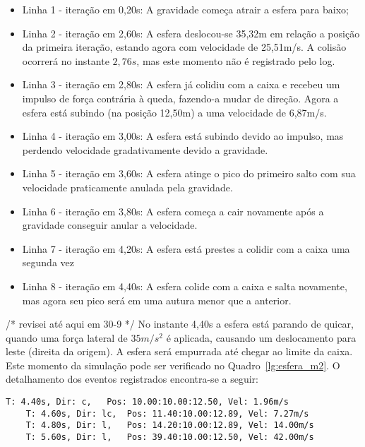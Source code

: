 \documentclass[12pt]{article}
\begin{document}
\begin{itemize}
	\item Linha 1 - iteração em 0,20s: A gravidade começa atrair a esfera para baixo;
	\item Linha 2 - iteração em 2,60s: A esfera deslocou-se 35,32m em relação a posição da primeira iteração, estando agora com velocidade de 25,51m/s. A colisão ocorrerá no instante $2,76s$, mas este momento não é registrado pelo log.
	\item Linha 3 - iteração em 2,80s: A esfera já colidiu com a caixa e recebeu um impulso de força contrária à queda, fazendo-a mudar de direção. Agora a esfera está subindo (na posição 12,50m) a uma velocidade de 6,87m/s. 
	\item Linha 4 - iteração em 3,00s: A esfera está subindo devido ao impulso, mas perdendo velocidade gradativamente devido a gravidade.
	\item Linha 5 - iteração em 3,60s: A esfera atinge o pico do primeiro salto com sua velocidade praticamente anulada pela gravidade.
	\item Linha 6 - iteração em 3,80s: A esfera começa a cair novamente após a gravidade conseguir anular a velocidade.
	\item Linha 7 - iteração em 4,20s: A esfera está prestes a colidir com a caixa uma segunda vez
	\item Linha 8 - iteração em 4,40s: A esfera colide com a caixa e salta novamente, mas agora seu pico será em uma autura menor que a anterior.
\end{itemize}

/* revisei até aqui em 30-9 */ 
No instante 4,40s a esfera está parando de quicar, quando uma força lateral de $35m/s^{2}$ é aplicada, causando um deslocamento para leste (direita da origem). A esfera será empurrada até chegar ao limite da caixa. Este momento da simulação pode ser verificado no Quadro~\ref{lg:esfera_m2}. O detalhamento dos eventos registrados encontra-se a seguir:



\begin{lstlisting}[frame=single,caption=Registro Acessível: Esfera sobre a caixa. \label{lg:esfera_m2}]
	T: 4.40s, Dir: c, 	Pos: 10.00:10.00:12.50, Vel: 1.96m/s
	T: 4.60s, Dir: lc, 	Pos: 11.40:10.00:12.89, Vel: 7.27m/s
	T: 4.80s, Dir: l, 	Pos: 14.20:10.00:12.89, Vel: 14.00m/s
	T: 5.60s, Dir: l, 	Pos: 39.40:10.00:12.50, Vel: 42.00m/s
\end{lstlisting}
\end{document}

